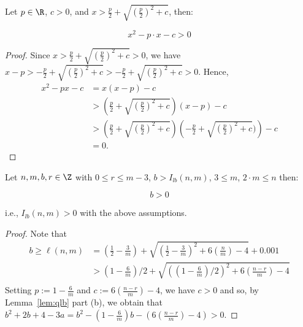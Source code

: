 \begin{lemma}[qlb]
    \label{lem:qlb}
    \leanok
    Let $p\in \R$, $c > 0$, and $x > \frac{p}{2} + \sqrt{\left(\frac{p}{2}\right)^2 + c}$, then:

    \[
        x^2 - p \cdot x- c > 0
    \]
\end{lemma}

\begin{proof}
    \leanok
    Since $x >\frac{p}{2} + \sqrt{\left(\frac{p}{2}\right)^ 2 + c} > 0$,
    we have $x - p > -\frac{p}{2} + \sqrt{\left(\frac{p}{2}\right)^ 2 + c}
    >-\frac{p}{2} + \sqrt{\left(\frac{p}{2}\right)^ 2 + c} > 0$. 
    Hence,
  \begin{align*}
    x^2 - px - c
    & = x(x - p) - c \\
    & > \left(\frac{p}{2} + \sqrt{\left(\frac{p}{2}\right)^ 2 + c}\right)
         (x-p) - c \\
    & > \left(\frac{p}{2} + \sqrt{\left(\frac{p}{2}\right)^ 2 + c}\right)
    \left(-\frac{p}{2}+\sqrt{\left(\frac{p}{2}\right)^ 2 + c})\right) - c \\
    & = 0.
  \end{align*}
\end{proof}

\begin{lemma}[I lb pos]
    \label{lem:I_lb_pos}
    \leanok
    Let $n,m,b,r\in\Z$ with $0 \leq r \leq m - 3$, $b > I_{lb}(n,m)$, $3 \leq m$, $2 \cdot m \leq n$ then:

    \[
        b > 0
    \]

    i.e., $I_{lb}(n,m) > 0$ with the above assumptions.
    
\end{lemma}

\begin{proof}
    \leanok
    Note that
    \begin{align*}
    b \geq \ell(n,m)
    & =
      \left(\frac{1}{2}-\frac{3}{m}\right)
      + \sqrt{\left(\frac{1}{2}-\frac{3}{m}\right)^2
      + 6\left(\frac{n}{m}\right) - 4}+0.001 \\ 
    & >
      \left(1-\frac{6}{m}\right)/2
      +\sqrt{\left(\left(1-\frac{6}{m}\right)/2\right)^2
      + 6\left(\frac{n-r}{m}\right) - 4} \\
    \end{align*}
    Setting $p := 1 - \frac{6}{m}$ and $c := 6 \left(\frac{n - r}{m}\right) - 4$,
      we have $c > 0$ and so, by Lemma~\ref{lem:qlb} part (b), we obtain that
    $b^2 + 2b + 4 - 3a = b ^ 2 - \left(1 - \frac{6}{m}\right) b -
    \left(6\left(\frac{n - r}{m}\right) - 4\right) > 0$.
\end{proof}

